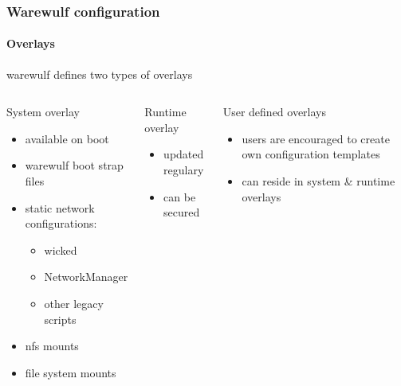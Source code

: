 \documentclass[aspectratio=169]{beamer}
\begin{document}
\begin{frame}[fragile]
\frametitle{Warewulf configuration}
\framesubtitle{Overlays}
warewulf defines two types of overlays
\begin{columns}
\begin{block}{System overlay}
\begin{itemize}
  \item available on boot
  \item warewulf boot strap files
  \item static network configurations:
  \begin{itemize}
    \item wicked
    \item NetworkManager
    \item other legacy scripts
  \end{itemize}
  \item nfs mounts
  \item file system mounts
\end{itemize}
\end{block}
\begin{block}{Runtime overlay}
\begin{itemize}
  \item updated regulary 
  \item can be secured
\end{itemize}
\end{block}
\begin{block}{User defined overlays}
\begin{itemize}
  \item users are encouraged to create own configuration templates
  \item can reside in system \& runtime overlays
\end{itemize}
\end{block}
\column{2cm}
\end{columns}
\end{frame}
\end{document}
